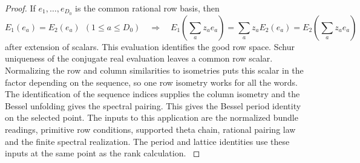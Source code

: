 \begin{proof}
If \(e_1,\ldots,e_{D_0}\) is the common rational row basis, then
\[
 E_1(e_a)=E_2(e_a)\ \ (1\le a\le D_0)
       \quad\Longrightarrow\quad
 E_1\!\left(\sum_a z_a e_a\right)
      =\sum_a z_a E_2(e_a)=E_2\!\left(\sum_a z_a e_a\right)
\]
after extension of scalars. This evaluation identifies the good
row space. Schur uniqueness
of the conjugate real evaluation leaves a common row
scalar. Normalizing the row and column similarities to
isometries puts this scalar in the factor depending on the sequence, so one
row isometry works for all the words. The identification of the sequence indices
supplies the column isometry and the Bessel unfolding
gives the spectral pairing. This gives the Bessel period identity on the selected point. The inputs to this
application are the normalized bundle readings, primitive
row conditions, supported theta chain, rational pairing
law and the finite spectral realization. The period and
lattice identities use these inputs at the same point
as the rank calculation.
\label{cor:selected-period-6}
\end{proof}
